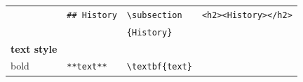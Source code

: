 \documentclass[10pt,fleqn]{wlpeerj}
\begin{document}
\begin{longtable}[]{@{}llll@{}}
&
\begin{minipage}[t]{0.18\columnwidth}\raggedright\strut
\texttt{\#\#\ History}\strut
\end{minipage}
&
\begin{minipage}[t]{0.25\columnwidth}\raggedright\strut
\texttt{\textbackslash{}subsection}\strut
\end{minipage}
&
\begin{minipage}[t]{0.26\columnwidth}\raggedright\strut
\texttt{\textless{}h2\textgreater{}\textless{}History\textgreater{}\textless{}/h2\textgreater{}}\strut
\end{minipage}\tabularnewline
\begin{minipage}[t]{0.20\columnwidth}\raggedright\strut
\strut
\end{minipage}
&
\begin{minipage}[t]{0.18\columnwidth}\raggedright\strut
\strut
\end{minipage}
&
\begin{minipage}[t]{0.25\columnwidth}\raggedright\strut
\texttt{\{History\}}\strut
\end{minipage}
&
\begin{minipage}[t]{0.26\columnwidth}\raggedright\strut
\strut
\end{minipage}\tabularnewline
\begin{minipage}[t]{0.20\columnwidth}\raggedright\strut
\textbf{text
style}\strut
\end{minipage}
&
\begin{minipage}[t]{0.18\columnwidth}\raggedright\strut
\strut
\end{minipage}
&
\begin{minipage}[t]{0.25\columnwidth}\raggedright\strut
\strut
\end{minipage}
&
\begin{minipage}[t]{0.26\columnwidth}\raggedright\strut
\strut
\end{minipage}\tabularnewline
\begin{minipage}[t]{0.20\columnwidth}\raggedright\strut
bold\strut
\end{minipage}
&
\begin{minipage}[t]{0.18\columnwidth}\raggedright\strut
\texttt{**text**}\strut
\end{minipage}
&
\begin{minipage}[t]{0.25\columnwidth}\raggedright\strut
\texttt{\textbackslash{}textbf\{text\}}\strut
\end{minipage}
&
\begin{minipage}[t]{0.26\columnwidth}\raggedright\strut

\end{minipage}
\end{longtable}
\end{document}
